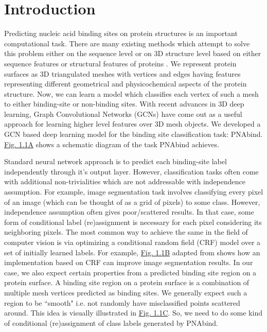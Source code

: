 \section{Introduction} Predicting nucleic acid binding sites on protein structures is an important computational task.  There are many existing methods which attempt to solve this problem either on the sequence level or on 3D structure level based on either sequence features or structural features of proteins \citep{deng2018pdrlgb, wang2010bindn+, wang2006bindn, li2013predna}.
We represent protein surfaces as 3D triangulated meshes with 
vertices and edges having features representing different geometrical and physicochemical aspects of the protein structure. Now, we can learn a model which classifies each vertex of such a mesh to either binding-site or
non-binding sites. With recent advances in 3D deep learning, Graph Convolutional
Networks (GCNs) have come out as a useful approach for learning higher level features over
3D mesh objects. We developed a GCN based deep learning model for the binding site classification
task: PNAbind. \hyperref[fig:crf_concept]{Fig. 1.1A} shows a schematic diagram of
the task PNAbind achieves.

Standard neural network approach is to predict each binding-site label independently
through it's output layer. However, classification tasks often come with additional non-trivialities which
are not addressable with independence assumption.  For example, image segmentation task involves
classifying every pixel of an image (which can be thought of as a grid of pixels) to some class.
However, independence assumption often gives poor/scattered results. In that case, some form of
conditional label (re)assignment is necessary for each pixel considering its neighboring pixels. The
most common way to achieve the same in the field of computer vision is via optimizing a conditional
random  field (CRF) model over a set of initially  learned labels. For example,
\hyperref[fig:crf_concept]{Fig. 1.1B} adapted
from \citet{krahenbuhl2012efficient}  shows how an implementation based on CRF can improve image
segmentation results. In our case, we also expect certain properties from a predicted binding site
region on a protein surface. A binding site region on a protein surface is a combination
of multiple mesh vertices predicted as binding sites. We generally expect such a region to be
``smooth" i.e. not randomly have misclassified points scattered around. This idea is visually illustrated in
\hyperref[fig:crf_concept]{Fig. 1.1C}. So, we need to do some kind
of conditional (re)assignment of class labels generated by PNAbind.

